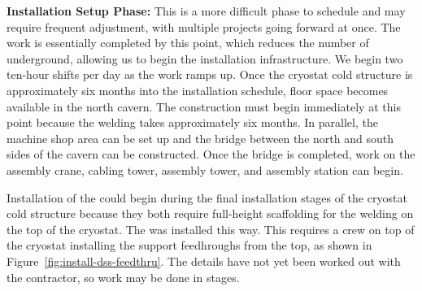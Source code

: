 {\bf Installation Setup Phase:} %
    This is a more difficult phase to schedule and may require frequent adjustment, with multiple projects going forward at once. The  work is essentially completed by this point, which reduces the number of  underground, allowing us to begin the installation infrastructure. 
     We begin two ten-hour shifts per day as the work ramps up.  Once the  cryostat cold structure is approximately six months into the installation schedule, floor space becomes available in the north cavern. The \coldbox construction must begin immediately at this point because the welding takes approximately six months. In parallel, the machine shop area can be set up and the bridge between the north and south sides of the cavern can be constructed.  Once the bridge is completed, work on the assembly crane,  cabling tower,  assembly tower, and  assembly station can begin. 
    
Installation of the  could begin during the final installation stages of the cryostat cold structure because they both require full-height scaffolding for the welding on the top of the cryostat. The   was installed this way. This requires a crew on top of the cryostat installing the  support feedhroughs from the top, as shown in Figure~\ref{fig:install-dss-feedthru}.  The details have not yet been worked out with the contractor, so work may be done in stages. 

